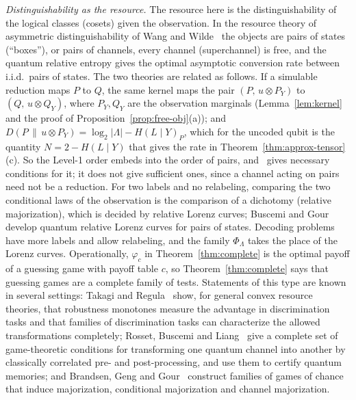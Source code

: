 \emph{Distinguishability as the resource.} The resource here is the distinguishability of the logical classes (cosets) given the observation. In the resource theory of asymmetric distinguishability of Wang and Wilde~\cite{WW19,WW19ch} the objects are pairs of states (``boxes''), or pairs of channels, every channel (superchannel) is free, and the quantum relative entropy gives the optimal asymptotic conversion rate between i.i.d.\ pairs of states. The two theories are related as follows. If a simulable reduction maps $P$ to $Q$, the same kernel maps the pair $(P,\,u\otimes P_Y)$ to $(Q,\,u\otimes Q_Y)$, where $P_Y,Q_Y$ are the observation marginals (Lemma~\ref{lem:kernel} and the proof of Proposition~\ref{prop:free-obj}(a)); and $D(P\,\|\,u\otimes P_Y)=\log_2|\Lambda|-H(L\mid Y)_P$, which for the uncoded qubit is the quantity $N=2-H(L\mid Y)$ that gives the rate in Theorem~\ref{thm:approx-tensor}(c). So the Level-1 order embeds into the order of pairs, and~\cite{WW19} gives necessary conditions for it; it does not give sufficient ones, since a channel acting on pairs need not be a reduction. For two labels and no relabeling, comparing the two conditional laws of the observation is the comparison of a dichotomy (relative majorization), which is decided by relative Lorenz curves; Buscemi and Gour~\cite{BuscemiGour} develop quantum relative Lorenz curves for pairs of states. Decoding problems have more labels and allow relabeling, and the family $\Phi_\Lambda$ takes the place of the Lorenz curves.
Operationally, $\varphi_c$ in Theorem~\ref{thm:complete} is the optimal payoff of a guessing game with payoff table $c$, so Theorem~\ref{thm:complete} says that guessing games are a complete family of tests. Statements of this type are known in several settings: Takagi and Regula~\cite{TakagiRegula} show, for general convex resource theories, that robustness monotones measure the advantage in discrimination tasks and that families of discrimination tasks can characterize the allowed transformations completely; Rosset, Buscemi and Liang~\cite{RBL} give a complete set of game-theoretic conditions for transforming one quantum channel into another by classically correlated pre- and post-processing, and use them to certify quantum memories; and Brandsen, Geng and Gour~\cite{BGG} construct families of games of chance that induce majorization, conditional majorization and channel majorization.

